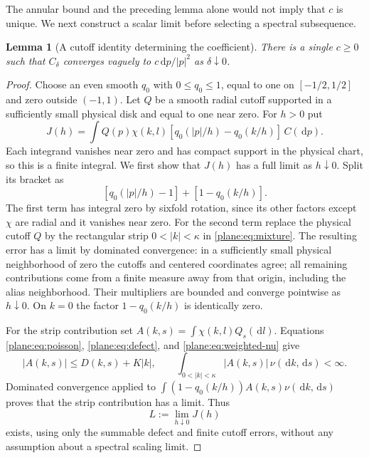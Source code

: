 \documentclass[11pt]{article}
\newcommand{\dd}{\,\mathrm d}
\newtheorem{lemma}[theorem]{Lemma}
\theoremstyle{definition}
\theoremstyle{remark}
\numberwithin{equation}{section}
\begin{document}
The annular bound and the preceding lemma alone would not imply that
$c$ is unique.  We next construct a scalar limit before selecting a
spectral subsequence.

\begin{lemma}[A cutoff identity determining the coefficient]
\label{plane:lem:unique}
There is a single $c\ge0$ such that $C_\delta$ converges vaguely to
$c\dd p/|p|^2$ as $\delta\downarrow0$.
\end{lemma}

\begin{proof}
Choose an even smooth $q_0$ with $0\le q_0\le1$, equal to one on
$[-1/2,1/2]$ and zero outside $(-1,1)$.  Let $Q$ be a smooth radial
cutoff supported in a sufficiently small physical disk and equal to
one near zero.  For $h>0$ put
\begin{equation}
 \label{plane:eq:cutoff}
 J(h)=\int Q(p)\chi(k,l)
       [q_0(|p|/h)-q_0(k/h)]\,C(\dd p).
\end{equation}
Each integrand vanishes near zero and has compact support in the
physical chart, so this is a finite integral.
We first show that $J(h)$ has a full limit as $h\downarrow0$.
Split its bracket as
\[
 [q_0(|p|/h)-1]+[1-q_0(k/h)].
\]
The first term has integral zero by sixfold rotation, since its other
factors except $\chi$ are radial and it vanishes near zero.
For the second term replace the physical cutoff $Q$ by the rectangular
strip $0<|k|<\kappa$ in \eqref{plane:eq:mixture}.  The resulting error
has a limit by dominated convergence: in a sufficiently small physical
neighborhood of zero the cutoffs and centered coordinates agree;
all remaining contributions come from a finite measure away from
that origin, including the alias neighborhood.  Their multipliers
are bounded and converge pointwise as $h\downarrow0$.  On $k=0$
the factor $1-q_0(k/h)$ is identically zero.

For the strip contribution set
$A(k,s)=\int\chi(k,l)Q_s(\dd l)$.  Equations
\eqref{plane:eq:poisson}, \eqref{plane:eq:defect}, and
\eqref{plane:eq:weighted-nu} give
\[
 |A(k,s)|\le D(k,s)+K|k|,
 \qquad
 \int_{0<|k|<\kappa}|A(k,s)|\,\nu(\dd k,\dd s)<\infty.
\]
Dominated convergence applied to
$\int(1-q_0(k/h))A(k,s)\nu(\dd k,\dd s)$ proves that the strip
contribution has a limit.  Thus
\begin{equation}
 \label{plane:eq:cutoff-full-limit}
 L:=\lim_{h\downarrow0}J(h)
\end{equation}
exists, using only the summable defect and finite cutoff errors,
without any assumption about a spectral scaling limit.


\end{proof}
\end{document}
